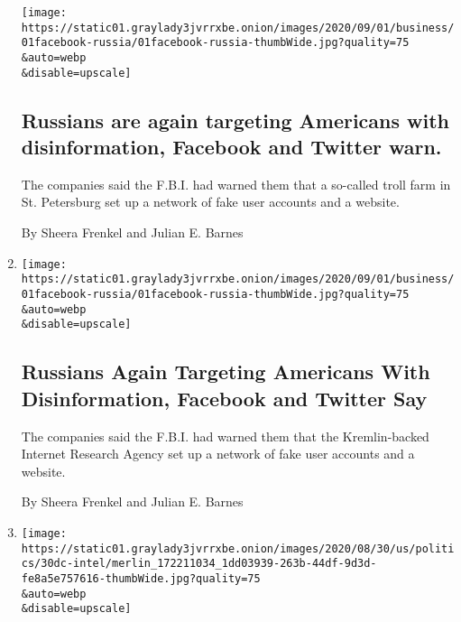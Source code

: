 \begin{enumerate}
  \texttt{[image: https://static01.graylady3jvrrxbe.onion/images/2020/09/01/business/01facebook-russia/01facebook-russia-thumbWide.jpg?quality=75\\\&auto=webp\\\&disable=upscale]}

  \hypertarget{russians-are-again-targeting-americans-with-disinformation-facebook-and-twitter-warn}{%
  \subsection{Russians are again targeting Americans with
  disinformation, Facebook and Twitter
  warn.}\label{russians-are-again-targeting-americans-with-disinformation-facebook-and-twitter-warn}}

  The companies said the F.B.I. had warned them that a so-called troll
  farm in St. Petersburg set up a network of fake user accounts and a
  website.

  By Sheera Frenkel and Julian E. Barnes
\item
  \href{/2020/09/01/technology/facebook-russia-disinformation-election.html}{}

  \texttt{[image: https://static01.graylady3jvrrxbe.onion/images/2020/09/01/business/01facebook-russia/01facebook-russia-thumbWide.jpg?quality=75\\\&auto=webp\\\&disable=upscale]}

  \hypertarget{russians-again-targeting-americans-with-disinformation-facebook-and-twitter-say}{%
  \subsection{Russians Again Targeting Americans With Disinformation,
  Facebook and Twitter
  Say}\label{russians-again-targeting-americans-with-disinformation-facebook-and-twitter-say}}

  The companies said the F.B.I. had warned them that the Kremlin-backed
  Internet Research Agency set up a network of fake user accounts and a
  website.

  By Sheera Frenkel and Julian E. Barnes
\item
  \href{/2020/08/31/us/elections/a-shift-on-election-briefings-to-congress-could-create-an-information-gap-for-voters.html}{}

  \texttt{[image: https://static01.graylady3jvrrxbe.onion/images/2020/08/30/us/politics/30dc-intel/merlin\_172211034\_1dd03939-263b-44df-9d3d-fe8a5e757616-thumbWide.jpg?quality=75\\\&auto=webp\\\&disable=upscale]}

  \hypertarget{a-shift-on-election-briefings-to-congress-could-create-an-information-gap-for-voters}{%
}
\end{enumerate}
